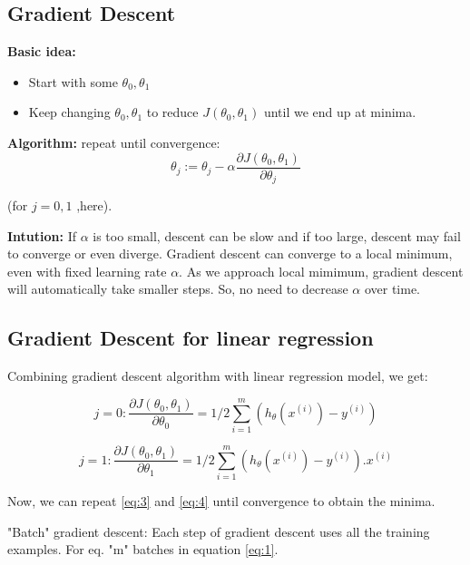 \documentclass[12pt]{report}
\begin{document}
\subsection{Gradient Descent}

\textbf{Basic idea:}
\begin{itemize}
\item Start with some $ \theta_0, \theta_1 $
\item Keep changing $ \theta_0, \theta_1 $ to reduce $ J(\theta_0, \theta_1) $ until we end up at minima.
\end{itemize} 

\textbf{Algorithm:}
 repeat until convergence:
\begin{equation} \label {eq:2}
	\theta_j := \theta_j - \alpha \frac{\partial {J(\theta_0, \theta_1)}}{\partial \theta_j}
\end{equation} 

(for  $j = 0, 1 $  ,here).	

\textbf{Intution:} 
If $\alpha$ is too small, descent can be slow and if too large, descent may fail to converge or even diverge.
Gradient descent can converge to a local minimum, even with fixed learning rate $\alpha$. As we approach local mimimum, gradient descent will automatically take smaller steps. So, no need to decrease $\alpha$ over time. 

\subsection{Gradient Descent for linear regression}
Combining gradient descent algorithm with linear regression model, we get:

\begin{equation} \label {eq:3}
	j = 0 : \frac{\partial {J(\theta_0, \theta_1)}}{\partial \theta_0} = 1/2 \sum_{i=1}^{m} (h_\theta(x^{(i)})-y^{(i)}) 
\end{equation}

\begin{equation} \label {eq:4}
	j = 1 : \frac{\partial {J(\theta_0, \theta_1)}}{\partial \theta_1} = 1/2 \sum_{i=1}^{m} (h_\theta(x^{(i)})-y^{(i)}).x^{(i)}
\end{equation}

Now, we can repeat \ref{eq:3} and \ref{eq:4} until convergence to obtain the minima.

"Batch" gradient descent: Each step of gradient descent uses all the training examples.
For eq. "m" batches in equation \ref{eq:1}.
\end{document}
